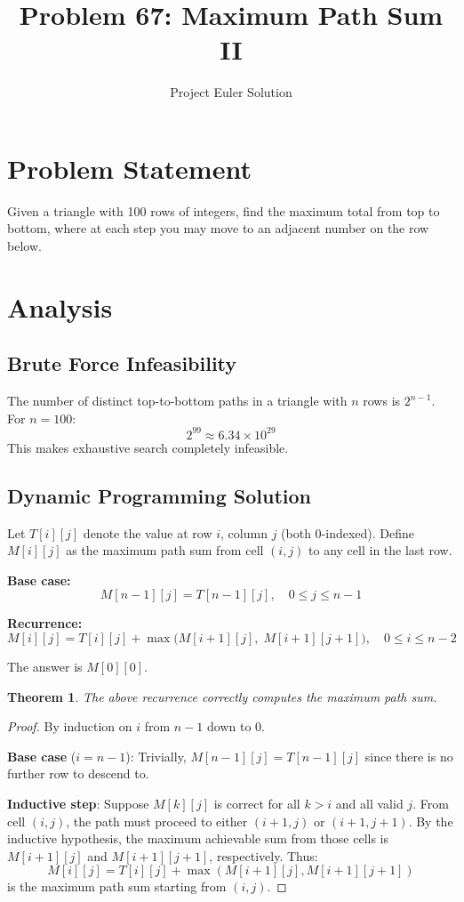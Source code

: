 \documentclass[12pt,a4paper]{article}
\title{Problem 67: Maximum Path Sum II}
\author{Project Euler Solution}
\date{}
\newtheorem{theorem}{Theorem}
\begin{document}
\maketitle

\section{Problem Statement}

Given a triangle with 100 rows of integers, find the maximum total from top to bottom, where at each step you may move to an adjacent number on the row below.

\section{Analysis}

\subsection{Brute Force Infeasibility}

The number of distinct top-to-bottom paths in a triangle with $n$ rows is $2^{n-1}$. For $n = 100$:
\[
2^{99} \approx 6.34 \times 10^{29}
\]
This makes exhaustive search completely infeasible.

\subsection{Dynamic Programming Solution}

Let $T[i][j]$ denote the value at row $i$, column $j$ (both 0-indexed). Define $M[i][j]$ as the maximum path sum from cell $(i,j)$ to any cell in the last row.

\textbf{Base case:}
\[
M[n-1][j] = T[n-1][j], \quad 0 \le j \le n-1
\]

\textbf{Recurrence:}
\[
M[i][j] = T[i][j] + \max\bigl(M[i+1][j],\; M[i+1][j+1]\bigr), \quad 0 \le i \le n-2
\]

The answer is $M[0][0]$.

\begin{theorem}
The above recurrence correctly computes the maximum path sum.
\end{theorem}

\begin{proof}
By induction on $i$ from $n-1$ down to $0$.

\textbf{Base case} ($i = n-1$): Trivially, $M[n-1][j] = T[n-1][j]$ since there is no further row to descend to.

\textbf{Inductive step}: Suppose $M[k][j]$ is correct for all $k > i$ and all valid $j$. From cell $(i, j)$, the path must proceed to either $(i+1, j)$ or $(i+1, j+1)$. By the inductive hypothesis, the maximum achievable sum from those cells is $M[i+1][j]$ and $M[i+1][j+1]$, respectively. Thus:
\[
M[i][j] = T[i][j] + \max(M[i+1][j], M[i+1][j+1])
\]
is the maximum path sum starting from $(i, j)$.
\end{proof}
\end{document}
